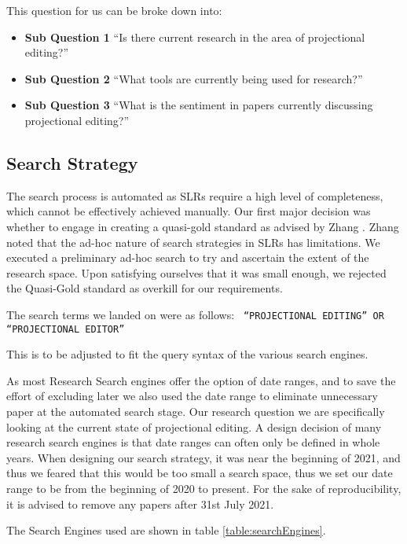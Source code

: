 This question for us can be broke down into:
\begin{itemize}
    \item \textbf{Sub Question 1} ``Is there current research in the area of projectional editing?''
    \item \textbf{Sub Question 2} ``What tools are currently being used for research?''
    \item \textbf{Sub Question 3} ``What is the sentiment in papers currently discussing projectional editing?''
\end{itemize}


\subsection{Search Strategy}

The search process is automated as SLRs require a high level of completeness, which cannot be effectively achieved manually.
Our first major decision was whether to engage in creating a quasi-gold standard as advised by Zhang \cite{Zhang_2011}. 
Zhang noted that the ad-hoc nature of search strategies in SLRs has limitations. 
We executed a preliminary ad-hoc search to try and ascertain the extent of the research space.
Upon satisfying ourselves that it was small enough, we rejected the Quasi-Gold standard as overkill for our requirements.

The search terms we landed on were as follows:
{\obeylines\obeyspaces
\texttt{
    ``PROJECTIONAL EDITING'' 
       OR 
    ``PROJECTIONAL EDITOR'' 
}}

This is to be adjusted to fit the query syntax of the various search engines.

As most Research Search engines offer the option of date ranges, and to save the effort of excluding later we also used the date range to eliminate unnecessary paper at the automated search stage.
Our research question we are specifically looking at the current state of projectional editing.
A design decision of many research search engines is that date ranges can often only be defined in whole years.
When designing our search strategy, it was near the beginning of 2021, and thus we feared that this would be too small a search space, thus we set our date range to be from the beginning of 2020 to present.
For the sake of reproducibility, it is advised to remove any papers after 31st July 2021.

The Search Engines used are shown in table \ref{table:searchEngines}.

